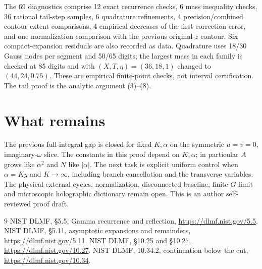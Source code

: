 \documentclass[11pt,a4paper]{article}
\begin{document}
The 69 diagnostics comprise 12 exact recurrence checks, 6 mass
inequality checks, 36 rational tail-step samples, 6 quadrature
refinements, 4 precision/combined contour-extent comparisons,
4 empirical decreases of the first-correction error, and
one normalization comparison with the previous original-\(z\) contour.
Six compact-expansion residuals are also recorded as data.
Quadrature uses 18/30 Gauss nodes per segment and 50/65 digits;
the largest mass in each family is checked at 85 digits and
with \((X,T,\eta)=(36,18,1)\) changed to \((44,24,0.75)\).
These are empirical finite-point checks, not interval certification.
The tail proof is the analytic argument (3)--(8).

\section{What remains}
The previous full-integral gap is closed for fixed \(K,\alpha\) on
the symmetric \(u=v=0\), imaginary-\(\omega\) slice.
The constants in this proof depend on \(K,\alpha\);
in particular \(A\) grows like \(\alpha^2\) and \(N\) like \(|\alpha|\).
The next task is explicit uniform control when \(\alpha=Ky\) and
\(K\to\infty\), including branch cancellation and the transverse
variables. The physical external cycles, normalization, disconnected
baseline, finite-\(G\) limit and microscopic holographic dictionary
remain open. This is an author self-reviewed proof draft.

\begin{thebibliography}{9}
 NIST DLMF, \S5.5, Gamma recurrence and reflection,
\url{https://dlmf.nist.gov/5.5}.
 NIST DLMF, \S5.11, asymptotic expansions and remainders,
\url{https://dlmf.nist.gov/5.11}.
 NIST DLMF, \S10.25 and \S10.27,
\url{https://dlmf.nist.gov/10.27}.
 NIST DLMF, 10.34.2, continuation below the cut,
\url{https://dlmf.nist.gov/10.34}.
\end{thebibliography}
\end{document}
